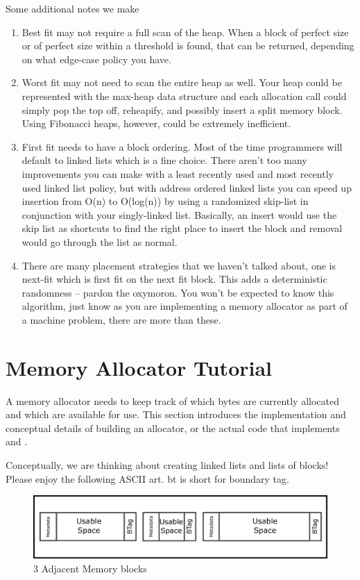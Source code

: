 Some additional notes we make

\begin{enumerate}
\item Best fit may not require a full scan of the heap. When a block of perfect size or of perfect size within a threshold is found, that can be returned, depending on what edge-case policy you have.
\item Worst fit may not need to scan the entire heap as well. Your heap could be represented with the max-heap data structure and each allocation call could simply pop the top off, reheapify, and possibly insert a split memory block.
  Using Fibonacci heaps, however, could be extremely inefficient.
\item First fit needs to have a block ordering. Most of the time programmers will default to linked lists which is a fine choice. There aren't too many improvements you can make with a least recently used and most recently used linked list policy, but with address ordered linked lists you can speed up insertion from O(n) to O(log(n)) by using a randomized skip-list in conjunction with your singly-linked list.
  Basically, an insert would use the skip list as shortcuts to find the right place to insert the block and removal would go through the list as normal.
\item There are many placement strategies that we haven't talked about, one is next-fit which is first fit on the next fit block. This adds a deterministic randomness -- pardon the oxymoron. You won't be expected to know this algorithm, just know as you are implementing a memory allocator as part of a machine problem, there are more than these.
  \end{enumerate}

\section{Memory Allocator Tutorial}

A memory allocator needs to keep track of which bytes are currently allocated and which are available for use.
This section introduces the implementation and conceptual details of building an allocator, or the actual code that implements  and .

Conceptually, we are thinking about creating linked lists and lists of blocks!
Please enjoy the following ASCII art.
bt is short for boundary tag.


\begin{figure}[H]
\centering
\includegraphics[width=.7\textwidth]{malloc/drawings/malloc_patching.eps}
\caption{3 Adjacent Memory blocks}
\end{figure}

